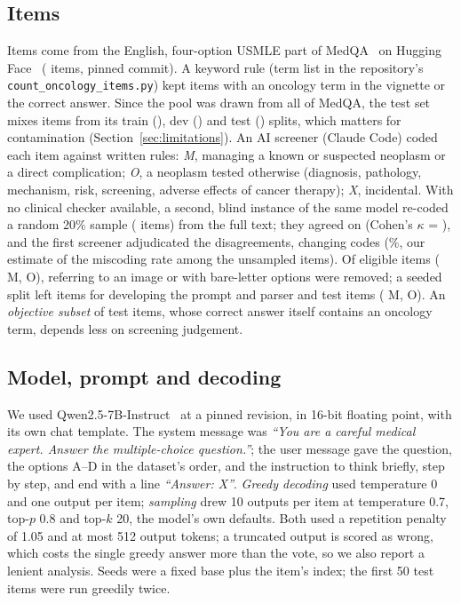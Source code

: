\subsection{Items}
Items come from the English, four-option USMLE part of MedQA~\cite{jin2021medqa} on Hugging Face~\cite{medqa_hf}
(\medqaN{} items, pinned commit). A keyword rule (term list in the repository's \texttt{count\_oncology\_items.py}) kept
\poolN{} items with an oncology term in the vignette or the correct answer. Since the pool was drawn from all of MedQA,
the test set mixes items from its train (\nOriginTrain), dev (\nOriginDev) and test (\nOriginTest) splits, which
matters for contamination (Section~\ref{sec:limitations}). An AI screener (Claude Code) coded each item against written
rules: \emph{M}, managing a known or suspected neoplasm or a direct complication; \emph{O}, a neoplasm tested otherwise
(diagnosis, pathology, mechanism, risk, screening, adverse effects of cancer therapy); \emph{X}, incidental. With no
clinical checker available, a second, blind instance of the same model re-coded a random 20\% sample (\screenN{} items)
from the full text; they agreed on \screenAgree{} (Cohen's $\kappa$ = \screenKappa), and the first screener adjudicated
the \adjudicatedN{} disagreements, changing \adjudicatedChanged{} codes (\screenChangedPct\%, our estimate of the
miscoding rate among the \unsampledN{} unsampled items). Of \eligibleN{} eligible items (\codeM{} M, \codeO{} O),
\excludedN{} referring to an image or with bare-letter options were removed; a seeded split left \debugN{} items for
developing the prompt and parser and \nTest{} test items (\nM{} M, \nO{} O). An \emph{objective subset} of \nObjective{}
test items, whose correct answer itself contains an oncology term, depends less on screening judgement.

\subsection{Model, prompt and decoding}
We used Qwen2.5-7B-Instruct~\cite{qwen2024qwen25,qwen25_7b_instruct} at a pinned revision, in 16-bit floating
point, with its own chat template. The system message was \emph{``You are a careful medical expert. Answer the
multiple-choice question.''}; the user message gave the question, the options A--D in the dataset's order, and the
instruction to think briefly, step by step, and end with a line \emph{``Answer: X''}. \emph{Greedy decoding} used
temperature 0 and one output per item; \emph{sampling} drew 10 outputs per item at temperature 0.7, top-$p$ 0.8 and
top-$k$ 20, the model's own defaults. Both used a repetition penalty of 1.05 and at most 512 output tokens; a truncated
output is scored as wrong, which costs the single greedy answer more than the vote, so we also report a lenient
analysis. Seeds were a fixed base plus the item's index; the first 50 test items were run greedily twice.

